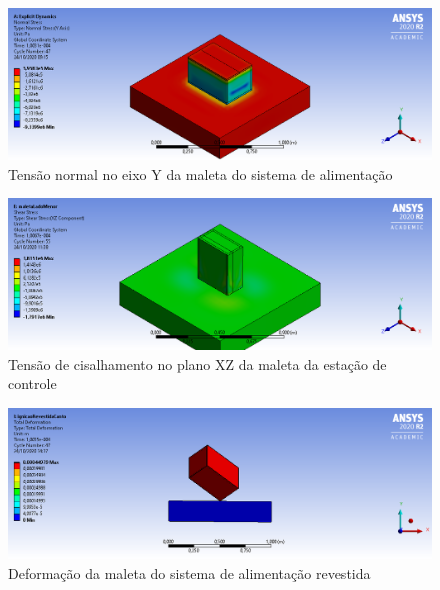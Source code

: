 \begin{figure}[H]
	\centering

		\includegraphics[width=1\textwidth]{figuras/estrutura_simulacaoImpacto/ignicaoNormalYLadoMaior.png}
	\caption{Tensão normal no eixo Y da maleta do sistema de alimentação}
	\label{normal_alimentacao1}
	\end{figure}

\begin{figure}[H]
	\centering

		\includegraphics[width=1\textwidth]{figuras/estrutura_simulacaoImpacto/maletaCisalhamentoXZMenor.png}
	\caption{Tensão de cisalhamento no plano XZ da maleta da estação de controle}
	\label{cisalhamento_controle2}
	\end{figure}

\begin{figure}[H]
	\centering

		\includegraphics[width=1\textwidth]{figuras/estrutura_simulacaoImpacto/ignicaoRevestidaDeformacaoCanto.png}
	\caption{Deformação da maleta do sistema de alimentação revestida}
	\label{deformacao_alimentacao3}
	\end{figure}

